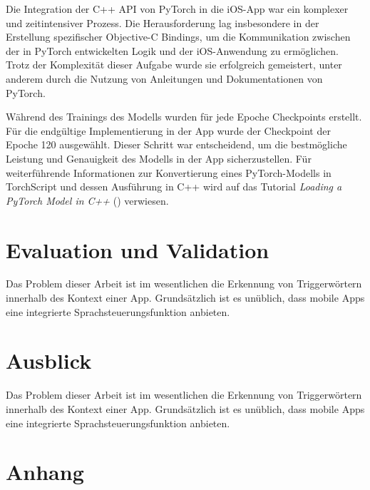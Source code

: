 \documentclass[11pt,a4paper]{article}
\begin{document}
\noindent \newline
Die Integration der C++ API von PyTorch in die iOS-App war ein komplexer und zeitintensiver Prozess. 
Die Herausforderung lag insbesondere in der Erstellung spezifischer Objective-C Bindings, um die 
Kommunikation zwischen der in PyTorch entwickelten Logik und der iOS-Anwendung zu ermöglichen. 
Trotz der Komplexität dieser Aufgabe wurde sie erfolgreich gemeistert, unter anderem durch die 
Nutzung von Anleitungen und Dokumentationen von PyTorch.

\noindent \newline
Während des Trainings des Modells wurden für jede Epoche Checkpoints erstellt. Für die endgültige 
Implementierung in der App wurde der Checkpoint der Epoche 120 ausgewählt. Dieser Schritt war 
entscheidend, um die bestmögliche Leistung und Genauigkeit des Modells in der App sicherzustellen. 
Für weiterführende Informationen zur Konvertierung eines PyTorch-Modells in TorchScript und dessen 
Ausführung in C++ wird auf das Tutorial \textit{Loading a PyTorch Model in C++} 
(\cite{pytorch2023jit}) verwiesen.


\newpage \section{Evaluation und Validation} \label{sec:evaluation}
Das Problem dieser Arbeit ist im wesentlichen die Erkennung von Triggerwörtern innerhalb
des Kontext einer App. Grundsätzlich ist es unüblich, dass mobile Apps eine
integrierte Sprachsteuerungsfunktion anbieten. 


\newpage \section{Ausblick}
Das Problem dieser Arbeit ist im wesentlichen die Erkennung von Triggerwörtern innerhalb
des Kontext einer App. Grundsätzlich ist es unüblich, dass mobile Apps eine
integrierte Sprachsteuerungsfunktion anbieten.

\newpage \section{Anhang}

\clearpage
\printglossary[type=\acronymtype,title=Akronyme]
\printglossary[title=Glossar]

\listoffigures
{}
\listoftables
\printbibliography[title=Literaturverzeichnis, heading=bibintoc]
\end{document}
